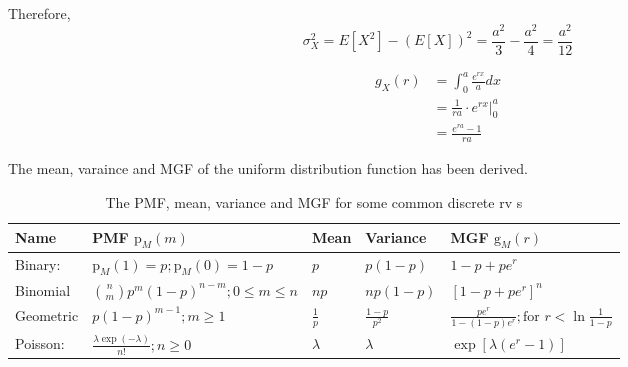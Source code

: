 \documentclass[UTF8]{article}
\begin{document}
\begin{enumerate}
            Therefore, 
            \begin{equation*}
                \sigma^2_X=E[X^2]-(E[X])^2=\frac{a^2}{3}-\frac{a^2}{4}=\frac{a^2}{12}
            \end{equation*}
            
            \begin{equation*}
                \begin{split}
                    g_X(r)&=\int^a_0\frac{e^{rx}}{a}dx\\
                    &=\frac{1}{ra}\cdot e^{rx}\big|^a_0\\
                    &=\frac{e^{ra}-1}{ra}
                \end{split}
            \end{equation*}


            The mean, varaince and MGF of the uniform distribution function has been derived.
    \end{enumerate}

    \begin{table}[h]
        \centering
        \caption{The PMF, mean, variance and MGF for some common discrete rv s}
        \begin{spacing}{2.0}
            \begin{tabular}{lllll}
                \hline
                Name & PMF $\text{p}_M(m)$ & Mean & Variance & MGF $\text{g}_M(r)$\\
                \hline
                Binary: & $\text{p}_M(1)=p;\text{p}_M(0)=1-p$ & $p$ & $p(1-p)$ & $1-p+pe^r$\\
                Binomial & $\binom{n}{m}p^m(1-p)^{n-m};0\leq m\leq n$ & $np$ & $np(1-p)$ & $[1-p+pe^r]^n$\\
                Geometric & $p(1-p)^{m-1};m\geq1$ & $\frac{1}{p}$ & $\frac{1-p}{p^2}$ & $\frac{pe^r}{1-(1-p)e^r};\text{for }r<\ln\frac{1}{1-p}$\\
                Poisson: & $\frac{\lambda\exp(-\lambda)}{n!};n\geq0$ & $\lambda$ & $\lambda$ & $\exp[\lambda(e^r-1)]$\\
                \hline           
            \end{tabular}
        \end{spacing}
    \end{table}
\end{document}
